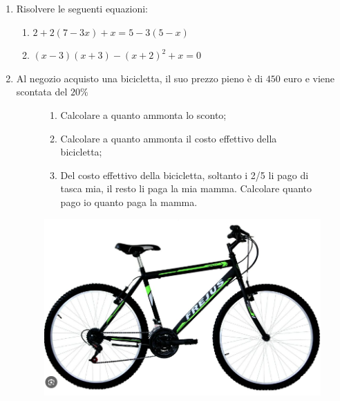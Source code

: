 \documentclass[14pt]{extarticle}
\begin{document}
\begin{enumerate}[label=\bfseries\arabic*)]
		\item Risolvere le seguenti equazioni:
		\begin{enumerate}
			\item 
				$
					2 + 2\left( 7 - 3x \right) + x = 5 -3(5 - x)
				$
			\item 
				$
					(x - 3)(x+3) - (x + 2)^2 + x = 0
				$
		\end{enumerate}
		\item Al negozio acquisto una bicicletta, il suo prezzo pieno è di $450$ euro e viene scontata del $20\%$
		




		\begin{figure}[h]
		    \begin{minipage}{0.6\textwidth}
				\begin{enumerate}
			    		\item Calcolare a quanto ammonta lo sconto;
			    		\item Calcolare a quanto ammonta il costo effettivo della bicicletta;
			    		\item Del costo effettivo della bicicletta, soltanto i 2/5 li pago di tasca mia, il resto li paga la mia mamma. Calcolare quanto pago io quanto paga la mamma.
				\end{enumerate}
		    \end{minipage}
		    \hfill
		    \begin{minipage}{0.3\textwidth}
				\centering
				\includegraphics[width=\textwidth]{bicicletta.png} %
		    \end{minipage}
		\end{figure}






\end{enumerate}
\end{document}
